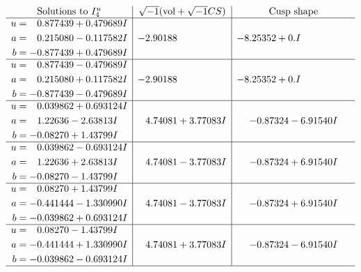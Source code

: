 \documentclass[1p]{elsarticle_modified}
\theoremstyle{definition}
\newcommand{\I}{\sqrt{-1}}
\begin{document}
$$\begin{array}{c|c|c}  
\text{Solutions to }I^u_{4}& \I (\text{vol} + \sqrt{-1}CS) & \text{Cusp shape}\\
 \hline 
\begin{aligned}
u &= \phantom{-}0.877439 + 0.479689 I \\
a &= \phantom{-}0.215080 - 0.117582 I \\
b &= -0.877439 + 0.479689 I\end{aligned}
 & -2.90188\phantom{ +0.000000I} & -8.25352 + 0. I\phantom{ +0.000000I} \\ \hline\begin{aligned}
u &= \phantom{-}0.877439 - 0.479689 I \\
a &= \phantom{-}0.215080 + 0.117582 I \\
b &= -0.877439 - 0.479689 I\end{aligned}
 & -2.90188\phantom{ +0.000000I} & -8.25352 + 0. I\phantom{ +0.000000I} \\ \hline\begin{aligned}
u &= \phantom{-}0.039862 + 0.693124 I \\
a &= \phantom{-}1.22636 - 2.63813 I \\
b &= -0.08270 + 1.43799 I\end{aligned}
 & \phantom{-}4.74081 + 3.77083 I & -0.87324 - 6.91540 I \\ \hline\begin{aligned}
u &= \phantom{-}0.039862 - 0.693124 I \\
a &= \phantom{-}1.22636 + 2.63813 I \\
b &= -0.08270 - 1.43799 I\end{aligned}
 & \phantom{-}4.74081 - 3.77083 I & -0.87324 + 6.91540 I \\ \hline\begin{aligned}
u &= \phantom{-}0.08270 + 1.43799 I \\
a &= -0.441444 - 1.330990 I \\
b &= -0.039862 + 0.693124 I\end{aligned}
 & \phantom{-}4.74081 - 3.77083 I & -0.87324 + 6.91540 I \\ \hline\begin{aligned}
u &= \phantom{-}0.08270 - 1.43799 I \\
a &= -0.441444 + 1.330990 I \\
b &= -0.039862 - 0.693124 I\end{aligned}
 & \phantom{-}4.74081 + 3.77083 I & -0.87324 - 6.91540 I\\
 \hline 
 \end{array}$$\newpage
\end{document}
